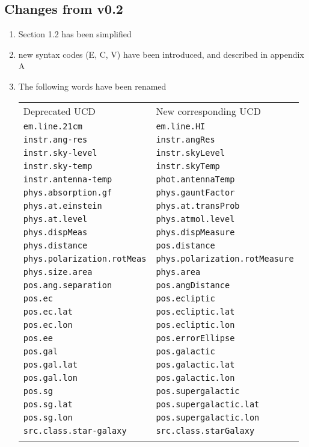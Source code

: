 \documentclass[11pt,a4paper]{ivoa}
\begin{document}
\subsection{Changes from v0.2}
\begin{enumerate}
\item Section 1.2 has been simplified
\item new syntax codes (E, C, V) have been introduced, and described in appendix A
\item The following words have been renamed

\begin{tabular}{|l|l|}
\sptablerule
Deprecated UCD & New corresponding UCD\\
\sptablerule
{\tt em.line.21cm} & {\tt em.line.HI}\\
{\tt instr.ang-res} & {\tt instr.angRes}\\
{\tt instr.sky-level} & {\tt instr.skyLevel}\\
{\tt instr.sky-temp} & {\tt instr.skyTemp}\\
{\tt instr.antenna-temp} & {\tt phot.antennaTemp}\\
{\tt phys.absorption.gf} & {\tt phys.gauntFactor}\\
{\tt phys.at.einstein} & {\tt phys.at.transProb}\\
{\tt phys.at.level} & {\tt phys.atmol.level}\\
{\tt phys.dispMeas} & {\tt phys.dispMeasure}\\ 
{\tt phys.distance} & {\tt pos.distance}\\
{\tt phys.polarization.rotMeas} & {\tt phys.polarization.rotMeasure}\\
{\tt phys.size.area} & {\tt phys.area}\\
{\tt pos.ang.separation} & {\tt pos.angDistance}\\ 
{\tt pos.ec} & {\tt pos.ecliptic}\\
{\tt pos.ec.lat} & {\tt pos.ecliptic.lat}\\
{\tt pos.ec.lon} & {\tt pos.ecliptic.lon}\\
{\tt pos.ee} & {\tt pos.errorEllipse}\\ 
{\tt pos.gal} & {\tt pos.galactic}\\
{\tt pos.gal.lat} & {\tt pos.galactic.lat}\\
{\tt pos.gal.lon} & {\tt pos.galactic.lon}\\
{\tt pos.sg} & {\tt pos.supergalactic}\\
{\tt pos.sg.lat} & {\tt pos.supergalactic.lat}\\
{\tt pos.sg.lon} & {\tt pos.supergalactic.lon}\\
{\tt src.class.star-galaxy} & {\tt src.class.starGalaxy}\\
\sptablerule
\end{tabular}


\end{enumerate}
\end{document}
